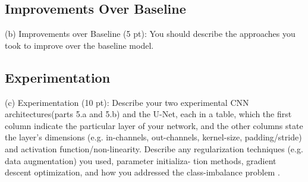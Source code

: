 \subsection*{Improvements Over Baseline}
(b) Improvements over Baseline (5 pt): You should describe the approaches you took to improve over the baseline model.
\subsection*{Experimentation}

(c) Experimentation (10 pt): Describe your two experimental CNN architectures(parts 5.a and 5.b) and the U-Net, each in a table, which the first column indicate the particular layer of your network, and the other columns state the layer’s dimensions (e.g. in-channels, out-channels, kernel-size, padding/stride) and activation function/non-linearity. Describe any regularization techniques (e.g. data augmentation) you used, parameter initializa- tion methods, gradient descent optimization, and how you addressed the class-imbalance problem .
